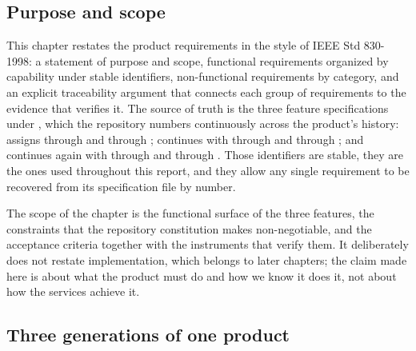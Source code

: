 \subsection{Purpose and scope}

This chapter restates the product requirements in the style of IEEE Std 830-1998: a statement of
purpose and scope, functional requirements organized by capability under stable identifiers,
non-functional requirements by category, and an explicit traceability argument that connects each
group of requirements to the evidence that verifies it. The source of truth is the three feature
specifications under , which the repository numbers continuously across the product's
history:  assigns  through  and
 through ;  continues with
 through  and  through ; and
 continues again with  through  and
 through . Those identifiers are stable, they are the ones used
throughout this report, and they allow any single requirement to be recovered from its
specification file by number.

The scope of the chapter is the functional surface of the three features, the constraints that the
repository constitution makes non-negotiable, and the acceptance criteria together with the
instruments that verify them. It deliberately does not restate implementation, which belongs to
later chapters; the claim made here is about what the product must do and how we know it does it,
not about how the services achieve it.

\subsection{Three generations of one product}

